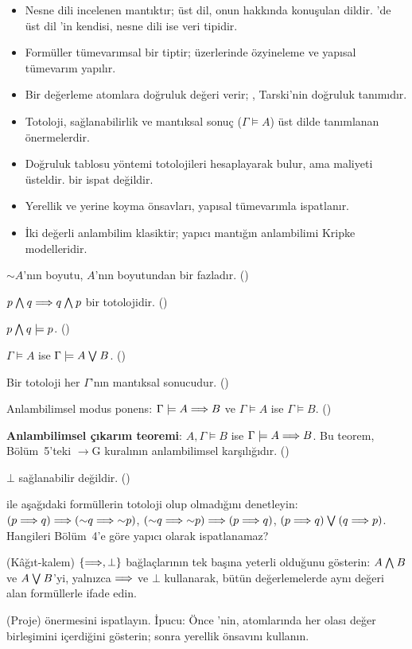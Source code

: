 \begin{bolumozeti}
\begin{itemize}
  \item Nesne dili incelenen mantıktır; üst dil, onun hakkında konuşulan
        dildir. \Lean{}'de üst dil \Lean{}'in kendisi, nesne dili ise
         veri tipidir.
  \item Formüller tümevarımsal bir tiptir; üzerlerinde özyineleme ve
        yapısal tümevarım yapılır.
  \item Bir değerleme atomlara doğruluk değeri verir; ,
        Tarski'nin doğruluk tanımıdır.
  \item Totoloji, sağlanabilirlik ve mantıksal sonuç ($\Gamma \models A$)
        üst dilde tanımlanan önermelerdir.
  \item Doğruluk tablosu yöntemi totolojileri hesaplayarak bulur, ama
        maliyeti üsteldir.  bir ispat değildir.
  \item Yerellik ve yerine koyma önsavları, yapısal tümevarımla ispatlanır.
  \item İki değerli anlambilim klasiktir; yapıcı mantığın anlambilimi
        Kripke modelleridir.
\end{itemize}
\end{bolumozeti}

\begin{alistirmalar}
 ${\sim}A$'nın boyutu, $A$'nın boyutundan bir fazladır.
()

 $p \mathbin{\textstyle\bigwedge} q \Longrightarrow q \mathbin{\textstyle\bigwedge} p$ bir totolojidir. ()

 $p \mathbin{\textstyle\bigwedge} q \models p$. ()

 $\Gamma \models A$ ise $\Gamma \models A \mathbin{\textstyle\bigvee} B$.
()

 Bir totoloji her $\Gamma$'nın mantıksal sonucudur.
()

 Anlambilimsel modus ponens: $\Gamma \models A \Longrightarrow B$ ve
$\Gamma \models A$ ise $\Gamma \models B$. ()

 \textbf{Anlambilimsel çıkarım teoremi}: $A, \Gamma \models B$
ise $\Gamma \models A \Longrightarrow B$. Bu teorem, Bölüm~5'teki $\to$G kuralının
anlambilimsel karşılığıdır. ()

 $\bot$ sağlanabilir değildir. ()

  ile aşağıdaki formüllerin totoloji olup
olmadığını denetleyin: $(p \Longrightarrow q) \Longrightarrow ({\sim}q \Longrightarrow {\sim}p)$,
$({\sim}q \Longrightarrow {\sim}p) \Longrightarrow (p \Longrightarrow q)$, $(p \Longrightarrow q) \mathbin{\textstyle\bigvee} (q \Longrightarrow p)$.
Hangileri Bölüm~4'e göre yapıcı olarak ispatlanamaz?

 (Kâğıt-kalem) $\{\Longrightarrow, \bot\}$ bağlaçlarının tek başına
yeterli olduğunu gösterin: $A \mathbin{\textstyle\bigwedge} B$ ve $A \mathbin{\textstyle\bigvee} B$'yi, yalnızca $\Longrightarrow$
ve $\bot$ kullanarak, bütün değerlemelerde aynı değeri alan formüllerle
ifade edin.

 (Proje)  önermesini
ispatlayın. İpucu: Önce 'nin, 
atomlarında her olası değer birleşimini içerdiğini gösterin; sonra
yerellik önsavını kullanın.
\end{alistirmalar}
